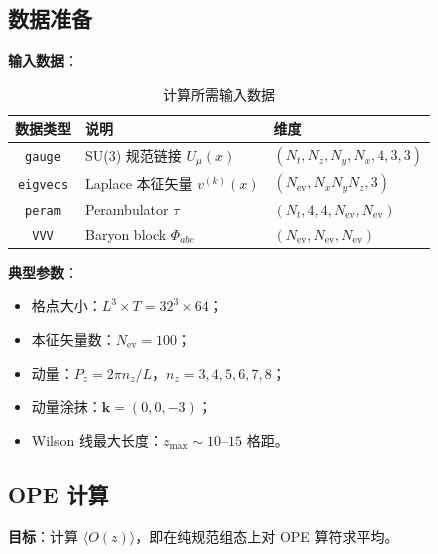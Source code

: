 \documentclass[11pt,a4paper]{ctexart}
\newcommand{\vev}[1]{\langle #1 \rangle}
\begin{document}
\subsection{数据准备}

\textbf{输入数据}：

\begin{table}[htbp]
\centering
\caption{计算所需输入数据}
\begin{tabular}{c l l}
\toprule
\textbf{数据类型} & \textbf{说明} & \textbf{维度} \\
\midrule
\texttt{gauge}    & SU(3) 规范链接 $U_\mu(x)$ & $(N_t, N_z, N_y, N_x, 4, 3, 3)$ \\
\texttt{eigvecs}  & Laplace 本征矢量 $v^{(k)}(x)$ & $(N_{\text{ev}}, N_x N_y N_z, 3)$ \\
\texttt{peram}    & Perambulator $\tau$ & $(N_t, 4, 4, N_{\text{ev}}, N_{\text{ev}})$ \\
\texttt{VVV}      & Baryon block $\Phi_{abc}$ & $(N_{\text{ev}}, N_{\text{ev}}, N_{\text{ev}})$ \\
\bottomrule
\end{tabular}
\end{table}

\textbf{典型参数}：
\begin{itemize}
  \item 格点大小：$L^3 \times T = 32^3 \times 64$；
  \item 本征矢量数：$N_{\text{ev}} = 100$；
  \item 动量：$P_z = 2\pi n_z / L$，$n_z = 3,4,5,6,7,8$；
  \item 动量涂抹：$\mathbf{k} = (0, 0, -3)$；
  \item Wilson 线最大长度：$z_{\text{max}} \sim 10\text{--}15$ 格距。
\end{itemize}

\subsection{OPE 计算}

\textbf{目标}：计算 $\vev{O(z)}$，即在纯规范组态上对 OPE 算符求平均。
\end{document}
